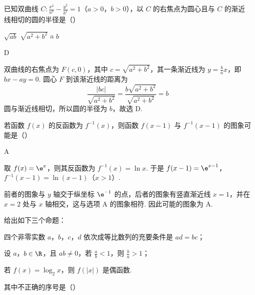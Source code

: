 \begin{problem}
已知双曲线 \(C: \frac{x^2}{a^2} - \frac{y^2}{b^2} = 1\)（\(a > 0\)，\(b > 0\)），以 \(C\) 的右焦点为圆心且与 \(C\) 的渐近线相切的圆的半径是（\quad）

\choices
    {\(\sqrt{ab}\)}
    {\(\sqrt{a^2 + b^2}\)}
    {a}
    {\(b\)}
\end{problem}

\begin{answer}
D
\end{answer}

\begin{solution}
双曲线的右焦点为 \(F(c,0)\)，其中 \(c=\sqrt{a^2+b^2}\)，其一条渐近线为 \(y=\frac ba x\)，即 \(bx-ay=0\). 圆心 \(F\) 到该渐近线的距离为
\[
\frac{|bc|}{\sqrt{a^2+b^2}}=\frac{b\sqrt{a^2+b^2}}{\sqrt{a^2+b^2}}=b
\]
圆与渐近线相切，所以圆的半径为 \(b\)，故选 D.
\end{solution}

\begin{problem}
若函数 \( f(x) \) 的反函数为 \( f^{-1}(x) \)，则函数 \( f(x - 1) \) 与 \( f^{-1}(x - 1) \) 的图象可能是（\quad）

    {}
    {}
    {}
\end{problem}

\begin{answer}
A
\end{answer}

\begin{solution}
取 \(f(x)=\e^x\)，则其反函数为 \(f^{-1}(x)=\ln x\). 于是 \(f(x-1)=\e^{x-1}\)，\(f^{-1}(x-1)=\ln(x-1)\)（\(x>1\)）.

前者的图象与 \(y\) 轴交于纵坐标 \(\e^{-1}\) 的点，后者的图象有竖直渐近线 \(x=1\)，并在 \(x=2\) 处与 \(x\) 轴相交，这与选项 A 的图象相符. 因此可能的图象为 A.
\end{solution}

\begin{problem}
给出如下三个命题：

\begin{circlelist}
\item 四个非零实数 \(a\)，\(b\)，\(c\)，\(d\) 依次成等比数列的充要条件是 \(ad = bc\)；
\item 设 \(a\)，\(b \in \R\)，且 \(ab \neq 0\)，若 \(\frac{a}{b} < 1\)，则 \(\frac{b}{a} > 1\)；
\item 若 \( f(x)=\log_{2}x \)，则 \( f(|x|) \) 是偶函数.
\end{circlelist}
其中不正确的序号是（\quad）

\choices
    {}
    {}
    {}
    {}
\end{problem}


